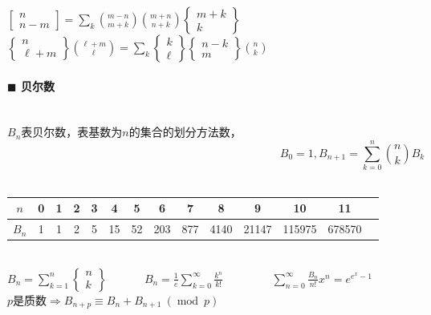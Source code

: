 ${\displaystyle\left[\begin{matrix} n \\ n-m \end{matrix}\right] = \sum_k {m-n \choose m+k} {m+n \choose n+k} \left\{\begin{matrix} m+k \\ k \end{matrix}\right\}}$\\
${\displaystyle \left\{\begin{matrix} n \\ \ell+m \end{matrix}\right\} {\ell+m \choose \ell} = \sum_k \left\{\begin{matrix} k \\ \ell \end{matrix}\right\} \left\{\begin{matrix} n-k \\ m \end{matrix}\right\} {n \choose k}}$\\

\paragraph{$\blacksquare$ 贝尔数}
\noindent \\
$B_n$表贝尔数，表基数为$n$的集合的划分方法数，$${\displaystyle B_0=1, B_{n+1}=\sum_{k=0}^{n}{\binom{n}{k} B_k}}$$\\
\begin{tabular}{|c|c|c|c|c|c|c|c|c|c|c|c|c|c|}
\hline $n$&0&1&2&3&4&5&6&7&8&9&10&11\\
\hline $B_n$&1&1&2&5&15&52&203&877&4140&21147&115975&678570\\
\hline
\end{tabular}\\
${\displaystyle B_n=\sum _{k=1}^{n} \left\{\begin{matrix} n \\ k \end{matrix}\right\}}$~~~~~~
${\displaystyle B_n=\frac{1}{e}\sum_{k=0}^\infty \frac{k^n}{k!}}$~~~~~~~~
${\displaystyle \sum_{n=0}^\infty \frac{B_n}{n!} x^n = e^{e^x-1}}$\\
$p$是质数$\Rightarrow B_{n+p}\equiv B_n+B_{n+1}~(\operatorname{mod}~p)$\\
